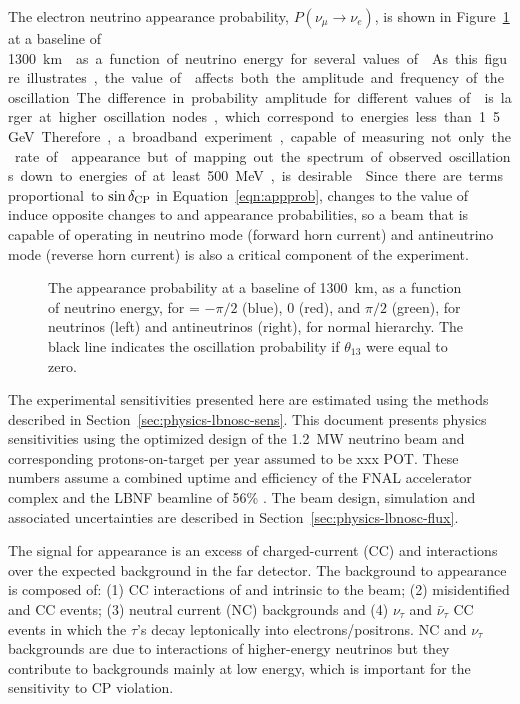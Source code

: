 The electron neutrino appearance probability, $P(\nu_\mu \rightarrow \nu_e)$, 
is shown in 
Figure~\ref{fig:oscprob} 
at a baseline of \SI{1300}\km{} as a function of neutrino 
energy for several values of \deltacp. As this figure illustrates, the value 
of \deltacp affects both the amplitude and frequency of
the oscillation. The difference in probability amplitude
for different values of \deltacp is larger at higher oscillation nodes, which 
correspond to energies less than 1.5~GeV. Therefore, a broadband experiment, 
capable of measuring not only the rate of \nue appearance but of mapping out the 
spectrum of observed oscillations down to energies of at least 500~MeV, 
is desirable~\cite{Diwan:2003bp}. Since there are terms proportional to $\sin\delta_{\rm CP}$ in Equation~\ref{eqn:appprob},
changes to the value of \deltacp induce opposite changes to \nue and
\anue appearance probabilities, so a beam that is capable of operating in
neutrino mode (forward horn current) and antineutrino mode (reverse horn current)
is also a critical component of the experiment.



\begin{figure}
  \centering
  \caption{The appearance probability at a baseline of 1300~km,
  as a function of neutrino energy, for \deltacp = $-\pi/2$ (blue), 
  0 (red), and $\pi/2$ (green), for neutrinos (left) and antineutrinos
  (right), for normal hierarchy. The black line indicates the oscillation
  probability if $\theta_{13}$ were equal to zero.}
  \label{fig:oscprob}
\end{figure}

The experimental sensitivities presented here are estimated using the methods described in Section~\ref{sec:physics-lbnosc-sens}. This document presents physics sensitivities using the optimized design of the 1.2~MW neutrino beam and corresponding protons-on-target per year assumed to be xxx POT.  These numbers assume a combined uptime and efficiency of the FNAL accelerator complex and the LBNF beamline of 56\% .  The beam design, simulation and associated uncertainties are described in Section~\ref{sec:physics-lbnosc-flux}.

The signal for \nue appearance is an excess of charged-current (CC) \nue and \anue interactions over the expected background in the far detector.  The background to \nue appearance is composed of: (1) CC interactions of \nue and \anue intrinsic to the beam; (2) misidentified \numu and \anumu CC events; (3) neutral current (NC) backgrounds and (4) $\nu_\tau$ and $\bar{\nu}_\tau$ CC events in which the $\tau$'s decay leptonically into electrons/positrons. NC and $\nu_\tau$ backgrounds are due to interactions of higher-energy
neutrinos but they contribute to backgrounds mainly at low energy, which is important for the sensitivity to CP violation.

